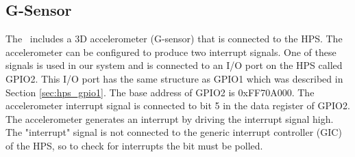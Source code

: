\subsection{G-Sensor}
\label{sec:hps_gsensor}
The \systemName~includes a 3D accelerometer (G-sensor) that is connected to the HPS. The accelerometer can be configured to produce two interrupt signals. One of
these signals is
used in our system and is connected to an I/O port on the HPS called GPIO2.
This I/O port has the same structure as GPIO1 which was described in Section \ref{sec:hps_gpio1}. The base address of GPIO2 is {\sf 0xFF70A000}. The accelerometer interrupt signal
is connected to bit 5 in the data register of GPIO2. 
The accelerometer generates an interrupt by driving
the interrupt signal high. The "interrupt"
signal is not connected to the generic interrupt controller (GIC) of the HPS, so to
check for interrupts the bit must be polled.